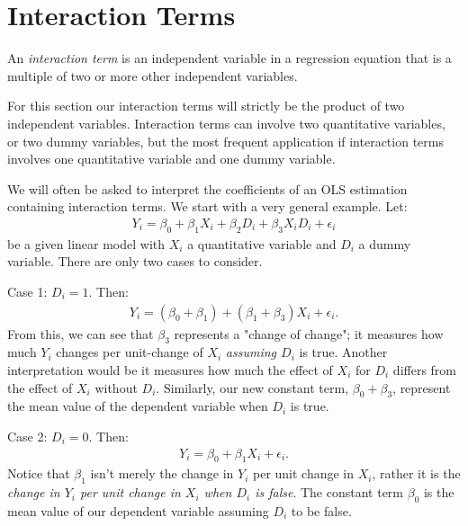 \documentclass[11pt,twoside,openany]{memoir}
\begin{document}
    \section*{Interaction Terms}
        \begin{definition}
            An \textit{interaction term} is an independent variable in a regression equation that is a multiple of two or more other independent variables.
        \end{definition}

        For this section our interaction terms will strictly be the product of two independent variables. Interaction terms can involve two quantitative variables, or two dummy variables, but the most frequent application if interaction terms involves one quantitative variable and one dummy variable.

        \begin{example}
            We will often be asked to interpret the coefficients of an OLS estimation containing interaction terms. We start with a very general example. Let:
                \begin{equation*}
                \begin{split}
                    Y_i = \beta_0 + \beta_1 X_{i} + \beta_2 D_i + \beta_3 X_i D_i + \epsilon_i
                \end{split}
                \end{equation*}
            be a given linear model with $X_i$ a quantitative variable and $D_i$ a dummy variable. There are only two cases to consider. 
            
            Case 1: $D_i = 1$. Then:
                \begin{equation*}
                \begin{split}
                    Y_i = (\beta_0 + \beta_1) + (\beta_1 + \beta_3) X_i + \epsilon_i.
                \end{split}
                \end{equation*}
            From this, we can see that $\beta_3$ represents a "change of change"; it measures how much $Y_i$ changes per unit-change of $X_i$ \textit{assuming $D_i$} is true. Another interpretation would be it measures how much the effect of $X_i$ for $D_i$ differs from the effect of $X_i$ without $D_i.$ Similarly, our new constant term, $\beta_0 + \beta_3$, represent the mean value of the dependent variable when $D_i$ is true.

            Case 2: $D_i = 0$. Then:
                \begin{equation*}
                \begin{split}
                    Y_i = \beta_0 + \beta_1 X_{i} + \epsilon_i.
                \end{split}
                \end{equation*}
            Notice that $\beta_1$ isn't merely the change in $Y_i$ per unit change in $X_i$, rather it is the \textit{change in $Y_i$ per unit change in $X_i$ when $D_i$ is false}. The constant term $\beta_0$ is the mean value of our dependent variable assuming $D_i$ to be false.
        \end{example}
\end{document}
